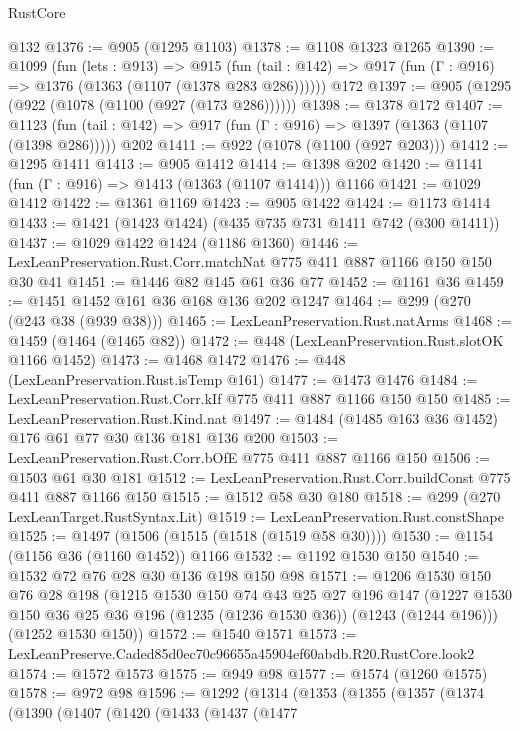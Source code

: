 \begin{lexlean}{RustCore}
\begin{coremodule}
    @132
@1376 := @905 (@1295 @1103)
@1378 := @1108 @1323 @1265
@1390 := @1099
    (fun (lets : @913) =>
    @915 (fun (tail : @142) => @917 (fun (Γ : @916) => @1376 (@1363 (@1107 (@1378 @283 @286))))))
    @172
@1397 := @905 (@1295 (@922 (@1078 (@1100 (@927 (@173 @286))))))
@1398 := @1378 @172
@1407 := @1123
    (fun (tail : @142) => @917 (fun (Γ : @916) => @1397 (@1363 (@1107 (@1398 @286)))))
    @202
@1411 := @922 (@1078 (@1100 (@927 @203)))
@1412 := @1295 @1411
@1413 := @905 @1412
@1414 := @1398 @202
@1420 := @1141 (fun (Γ : @916) => @1413 (@1363 (@1107 @1414))) @1166
@1421 := @1029 @1412
@1422 := @1361 @1169
@1423 := @905 @1422
@1424 := @1173 @1414
@1433 := @1421 (@1423 @1424) (@435 @735 @731 @1411 @742 (@300 @1411))
@1437 := @1029 @1422 @1424 (@1186 @1360)
@1446 := LexLeanPreservation.Rust.Corr.matchNat @775 @411 @887 @1166 @150 @150 @30 @41
@1451 := @1446 @82 @145 @61 @36 @77
@1452 := @1161 @36
@1459 := @1451 @1452 @161 @36 @168 @136 @202 @1247
@1464 := @299 (@270 (@243 @38 (@939 @38)))
@1465 := LexLeanPreservation.Rust.natArms
@1468 := @1459 (@1464 (@1465 @82))
@1472 := @448 (LexLeanPreservation.Rust.slotOK @1166 @1452)
@1473 := @1468 @1472
@1476 := @448 (LexLeanPreservation.Rust.isTemp @161)
@1477 := @1473 @1476
@1484 := LexLeanPreservation.Rust.Corr.kIf @775 @411 @887 @1166 @150 @150
@1485 := LexLeanPreservation.Rust.Kind.nat
@1497 := @1484 (@1485 @163 @36 @1452) @176 @61 @77 @30 @136 @181 @136 @200
@1503 := LexLeanPreservation.Rust.Corr.bOfE @775 @411 @887 @1166 @150
@1506 := @1503 @61 @30 @181
@1512 := LexLeanPreservation.Rust.Corr.buildConst @775 @411 @887 @1166 @150
@1515 := @1512 @58 @30 @180
@1518 := @299 (@270 LexLeanTarget.RustSyntax.Lit)
@1519 := LexLeanPreservation.Rust.constShape
@1525 := @1497 (@1506 (@1515 (@1518 (@1519 @58 @30))))
@1530 := @1154 (@1156 @36 (@1160 @1452)) @1166
@1532 := @1192 @1530 @150
@1540 := @1532 @72 @76 @28 @30 @136 @198 @150 @98
@1571 := @1206
    @1530
    @150
    @76
    @28
    @198
    (@1215
      @1530
      @150
      @74
      @43
      @25
      @27
      @196
      @147
      (@1227 @1530 @150 @36 @25 @36 @196 (@1235 (@1236 @1530 @36)) (@1243 (@1244 @196)))
      (@1252 @1530 @150))
@1572 := @1540 @1571
@1573 := LexLeanPreserve.Caded85d0ec70c96655a45904ef60abdb.R20.RustCore.look2
@1574 := @1572 @1573
@1575 := @949 @98
@1577 := @1574 (@1260 @1575)
@1578 := @972 @98
@1596 := @1292
    (@1314
      (@1353
        (@1355
          (@1357
            (@1374
              (@1390
                (@1407
                  (@1420
                    (@1433
                      (@1437
                        (@1477

\end{coremodule}
\end{lexlean}
